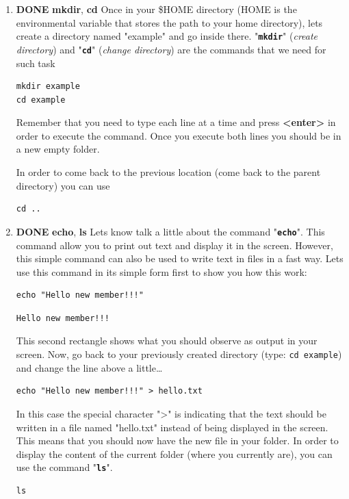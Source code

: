 \documentclass[11pt]{article}
\begin{document}
\begin{enumerate}
\item {\bfseries\sffamily DONE} \textbf{mkdir}, \textbf{cd}
\label{sec-2-1-3-1}
Once in your \$HOME directory (HOME is the environmental variable that stores the path to your home directory), lets create a directory named "example" and go inside there. "\textbf{\texttt{mkdir}}" (\emph{create directory}) and "\textbf{\texttt{cd}}" (\emph{change directory}) are the commands that we need for such task
\begin{verbatim}
mkdir example
cd example
\end{verbatim}
Remember that you need to type each line at a time and press \textbf{<enter>} in order to execute the command. Once you execute both lines you should be in a new empty folder.

In order to come back to the previous location (come back to the parent directory) you can use 
\begin{verbatim}
cd ..
\end{verbatim}

\item {\bfseries\sffamily DONE} \textbf{echo}, \textbf{ls}
\label{sec-2-1-3-2}
Lets know talk a little about the command "\textbf{\texttt{echo}}". This command allow you to print out text and display it in the screen. However, this simple command can also be used to write text in files in a fast way. Lets use this command in its simple form first to show you how this work:
\begin{verbatim}
echo "Hello new member!!!"
\end{verbatim}

\begin{verbatim}
Hello new member!!!
\end{verbatim}

This second rectangle shows what you should observe as output in your screen. Now, go back to your previously created directory (type: \texttt{cd example}) and change the line above a little\ldots{}
\begin{verbatim}
echo "Hello new member!!!" > hello.txt
\end{verbatim}

In this case the special character ">" is indicating that the text should be written in a file named "hello.txt" instead of being displayed in the screen. This means that you should now have the new file in your folder. In order to display the content of the current folder (where you currently are), you can use the command "\textbf{\texttt{ls}}".
\begin{verbatim}
ls
\end{verbatim}


\end{enumerate}
\end{document}
